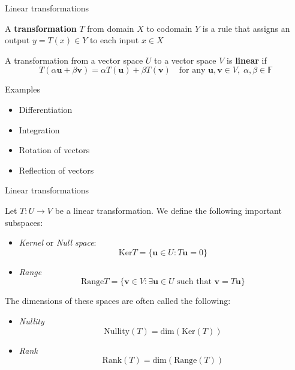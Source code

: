 \documentclass [aspectratio=169]{beamer}
\newcommand{\bu}{{\mathbf{u}}}
\newcommand{\bv}{{\mathbf{v}}}
\newcommand{\F}{{\mathbb{F}}}
\begin{document}
\begin{frame}{Linear transformations}
\begin{definition}
A \textbf{transformation} $T$ from domain $X$ to codomain $Y$ is a rule that assigns an output $y = T(x) \in Y$ to each input $x \in X$
\end{definition}

\begin{definition}
A transformation from a vector space $U$ to a vector space $V$ is \textbf{linear} if
\begin{equation*}
    T(\alpha \bu + \beta \bv) = \alpha T(\bu) + \beta T(\bv) \quad \text{for any } \bu, \bv \in V, \; \alpha, \beta \in \F
\end{equation*}
\end{definition}

\end{frame}


\begin{frame}{Examples}

\begin{itemize}
\item Differentiation
\item Integration
\item Rotation of vectors
\item Reflection of vectors
\end{itemize}


\end{frame}


\begin{frame}{Linear transformations}
\begin{definition}
Let $T:U \to V$ be a linear transformation. We define the following important subspaces:
\begin{itemize}
\item \emph{Kernel} or \emph{Null space}: 
$$\text{Ker} T = \{\bu \in U : T\bu = 0 \}$$
\item \emph{Range} 
$$\text{Range} T = \{\bv \in V : \exists \bu \in U \text{ such that } \bv = T \bu \}$$
\end{itemize}
The dimensions of these spaces are often called the following:
\begin{itemize}
\item \emph{Nullity}
$$\text{Nullity}(T) = \text{dim}(\text{Ker}(T))$$
\item \emph{Rank}
$$\text{Rank}(T) = \text{dim}(\text{Range}(T))$$
\end{itemize}
\end{definition}

\end{frame}
\end{document}

